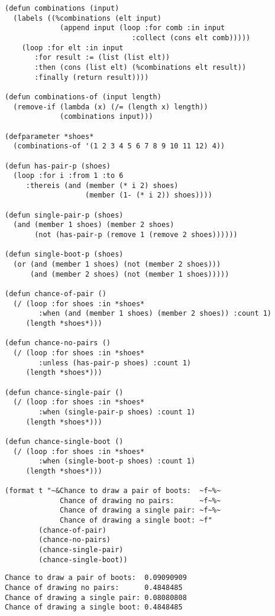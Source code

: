 \documentclass[11pt]{article}
\begin{document}
\lstset{language=Lisp,numbers=none}
\begin{lstlisting}
(defun combinations (input)
  (labels ((%combinations (elt input)
             (append input (loop :for comb :in input
                              :collect (cons elt comb)))))
    (loop :for elt :in input
       :for result := (list (list elt))
       :then (cons (list elt) (%combinations elt result))
       :finally (return result))))

(defun combinations-of (input length)
  (remove-if (lambda (x) (/= (length x) length))
             (combinations input)))

(defparameter *shoes*
  (combinations-of '(1 2 3 4 5 6 7 8 9 10 11 12) 4))

(defun has-pair-p (shoes)
  (loop :for i :from 1 :to 6
     :thereis (and (member (* i 2) shoes)
                   (member (1- (* i 2)) shoes))))

(defun single-pair-p (shoes)
  (and (member 1 shoes) (member 2 shoes)
       (not (has-pair-p (remove 1 (remove 2 shoes))))))

(defun single-boot-p (shoes)
  (or (and (member 1 shoes) (not (member 2 shoes)))
      (and (member 2 shoes) (not (member 1 shoes)))))

(defun chance-of-pair ()
  (/ (loop :for shoes :in *shoes*
        :when (and (member 1 shoes) (member 2 shoes)) :count 1)
     (length *shoes*)))

(defun chance-no-pairs ()
  (/ (loop :for shoes :in *shoes*
        :unless (has-pair-p shoes) :count 1)
     (length *shoes*)))

(defun chance-single-pair ()
  (/ (loop :for shoes :in *shoes*
        :when (single-pair-p shoes) :count 1)
     (length *shoes*)))

(defun chance-single-boot ()
  (/ (loop :for shoes :in *shoes*
        :when (single-boot-p shoes) :count 1)
     (length *shoes*)))

(format t "~&Chance to draw a pair of boots:  ~f~%~
             Chance of drawing no pairs:      ~f~%~
             Chance of drawing a single pair: ~f~%~
             Chance of drawing a single boot: ~f"
        (chance-of-pair)
        (chance-no-pairs)
        (chance-single-pair)
        (chance-single-boot))
\end{lstlisting}

\begin{verbatim}
Chance to draw a pair of boots:  0.09090909
Chance of drawing no pairs:      0.4848485
Chance of drawing a single pair: 0.08080808
Chance of drawing a single boot: 0.4848485
\end{verbatim}
\end{document}
